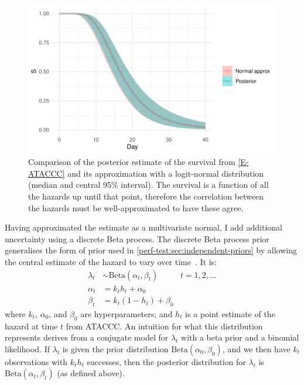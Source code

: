 \documentclass[thesis.tex]{subfiles}
\begin{document}
\begin{figure}
  \centering \includegraphics{cis-perfect-testing/ataccc-approximation-survival}
  \caption[Approximating the ATACCC posterior survival as a logit-normal]{Comparison of the posterior estimate of the survival from \cref{E-ATACCC} and its approximation with a logit-normal distribution (median and central 95\% interval). The survival is a function of all the hazards up until that point, therefore the correlation between the hazards must be well-approximated to have these agree. \label{perf-test:fig:approximate-ATACCC-survival}}
\end{figure}

Having approximated the estimate as a multivariate normal, I add additional uncertainty using a discrete Beta process.
The discrete Beta process prior generalises the form of prior used in \cref{perf-test:sec:independent-priors} by allowing the central estimate of the hazard to vary over time~\autocite{ibrahimBayesian,sunStatisticala}.
It is:
\begin{align}
  \lambda_t &\sim \text{Beta}(\alpha_t, \beta_t) &t = 1, 2, \dots \\
  \alpha_t &= k_t h_t + \alpha_0 \\
  \beta_t &= k_t (1 - h_t) + \beta_0
\end{align}
where $k_t$, $\alpha_0$, and $\beta_0$ are hyperparameters; and $h_t$ is a point estimate of the hazard at time $t$ from ATACCC.
An intuition for what this distribution represents derives from a conjugate model for $\lambda_t$ with a beta prior and a binomial likelihood.
If $\lambda_t$ is given the prior distribution $\text{Beta}(\alpha_0, \beta_0)$, and we then have $k_t$ observations with $k_t h_t$ successes, then the posterior distribution for $\lambda_t$ is $\text{Beta}(\alpha_t, \beta_t)$ (as defined above).
\end{document}
